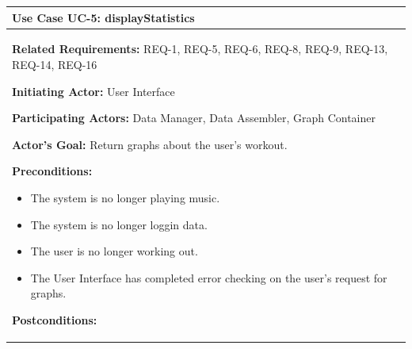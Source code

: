 \documentclass[letterpaper,english, 12pt]{scrreprt}
\begin{document}
\begin{center}
        \begin{longtable}{|C{15cm}|}
                \hline
                        \textbf{Use Case UC-5: displayStatistics}\\

                \hline
                        \begin{flushleft}
                                \textbf{Related Requirements: } REQ-1, REQ-5, REQ-6, REQ-8, REQ-9, REQ-13, REQ-14, REQ-16
                        \end{flushleft}
                        \begin{flushleft}
                                \textbf{Initiating Actor: } User Interface
                        \end{flushleft}
                        \begin{flushleft}
                                \textbf{Participating Actors: } Data Manager, Data Assembler, Graph Container
                        \end{flushleft}
                        \begin{flushleft}
                                \textbf{Actor's Goal: } Return graphs about the user's workout.
                        \end{flushleft}
                        \begin{flushleft}
                                \textbf{Preconditions: }
                        \end{flushleft}
                                \begin{itemize}
                                        \item The system is no longer playing music.
                                        \item The system is no longer loggin data.
                                        \item The user is no longer working out.
                                        \item The User Interface has completed error checking on the user's request for graphs.
                                \end{itemize}
                        \begin{flushleft}
                                \textbf{Postconditions: }
                        \end{flushleft}
                                \begin{itemize}

\end{itemize}
\end{longtable}
\end{center}
\end{document}
